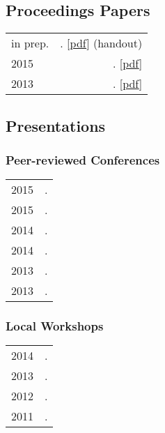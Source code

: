 \documentclass[11pt,letterpaper,twoside]{article}
\makeatletter
\newcommand{\myvrule}{\color{lightgray}\vrule width 1.0pt}
\newenvironment{cvsection}{%
  \renewcommand{\arraystretch}{1.75}
  \begin{longtable}[l]{@{} L R @{}}
}{%
  \end{longtable}
}
\makeatother
\begin{document}
\subsection*{Proceedings Papers}

\begin{cvsection}
  in prep. & \null{}.
  [\href{http://people.linguistics.mcgill.ca/~brian.buccola/files/buccola2015sub20.pdf}{pdf}]
    {\footnotesize (handout)} \\

  2015 & \null{}.
  [\href{http://people.linguistics.mcgill.ca/~brian.buccola/files/buccola2015nels45.pdf}{pdf}] \\

  2013 & \null{}.
  [\href{http://people.linguistics.mcgill.ca/~brian.buccola/files/buccola2013fg.pdf}{pdf}] \\
\end{cvsection}

\subsection*{Presentations}

\subsubsection*{Peer-reviewed Conferences}

\begin{cvsection}
  2015 & \null{}. \\
  2015 & \null{}. \\
  2014 & \null{}. \\
  2014 & \null{}. \\
  2013 & \null{}. \\
  2013 & \null{}. \\
\end{cvsection}

\subsubsection*{Local Workshops}

\begin{cvsection}
  2014 & \null{}. \\
  2013 & \null{}. \\
  2012 & \null{}. \\
  2011 & \null{}. \\
\end{cvsection}
\end{document}

